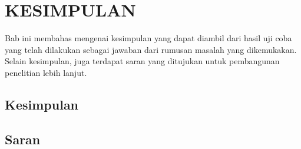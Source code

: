 \chapter{KESIMPULAN}

Bab ini membahas mengenai kesimpulan yang dapat diambil dari hasil uji coba yang telah dilakukan sebagai jawaban dari rumusan masalah yang dikemukakan. Selain kesimpulan, juga terdapat saran yang ditujukan untuk pembangunan penelitian lebih lanjut.

\section{Kesimpulan}

\section{Saran}